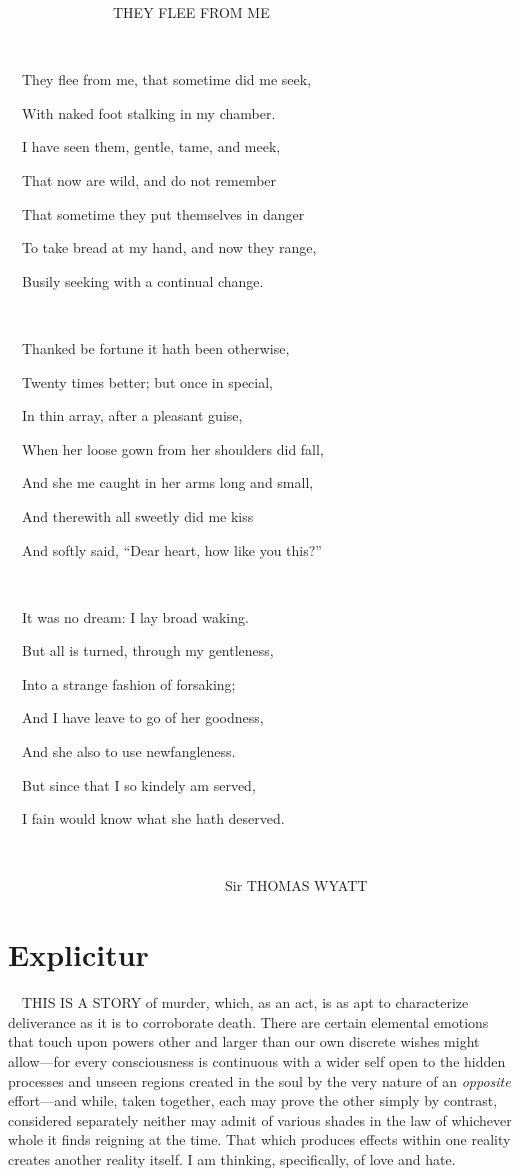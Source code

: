 \clearpage
~~~~~~~~~~~~~~~THEY FLEE FROM ME

~

~~They flee from me, that sometime did me seek,

~~With naked foot stalking in my chamber.

~~I have seen them, gentle, tame, and meek,

~~That now are wild, and do not remember

~~That sometime they put themselves in danger

~~To take bread at my hand, and now they range,

~~Busily seeking with a continual change.

~

~~Thanked be fortune it hath been otherwise,

~~Twenty times better; but once in special,

~~In thin array, after a pleasant guise,

~~When her loose gown from her shoulders did fall,

~~And she me caught in her arms long and small,

~~And therewith all sweetly did me kiss

~~And softly said, ``Dear heart, how like you this?''

~

~~It was no dream: I lay broad waking.

~~But all is turned, through my gentleness,

~~Into a strange fashion of forsaking;

~~And I have leave to go of her goodness,

~~And she also to use newfangleness.

~~But since that I so kindely am served,

~~I fain would know what she hath deserved.

~

~~~~~~~~~~~~~~~~~~~~~~~~~~~~~~~Sir THOMAS WYATT



\chapter*{Explicitur}
%

~~THIS IS A STORY of murder, which, as an act, is as apt to characterize
deliverance as it is to corroborate death. There are certain elemental
emotions that touch upon powers other and larger than our own discrete
wishes might allow---for every consciousness is continuous with a wider
self open to the hidden processes and unseen regions created in the soul
by the very nature of an \emph{opposite} effort---and while, taken
together, each may prove the other simply by contrast, considered
separately neither may admit of various shades in the law of whichever
whole it finds reigning at the time. That which produces effects within
one reality creates another reality itself. I am thinking, specifically,
of love and hate.

